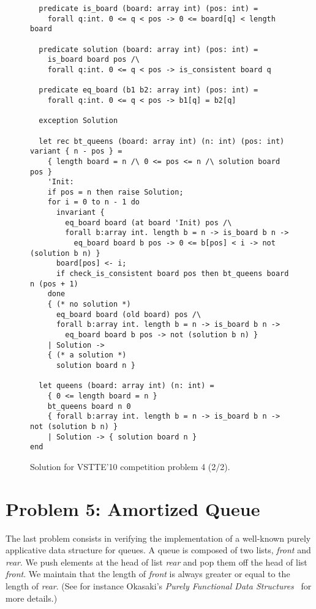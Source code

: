 \begin{figure}
  \centering
\begin{verbatim}
  predicate is_board (board: array int) (pos: int) =
    forall q:int. 0 <= q < pos -> 0 <= board[q] < length board

  predicate solution (board: array int) (pos: int) =
    is_board board pos /\
    forall q:int. 0 <= q < pos -> is_consistent board q

  predicate eq_board (b1 b2: array int) (pos: int) =
    forall q:int. 0 <= q < pos -> b1[q] = b2[q]

  exception Solution

  let rec bt_queens (board: array int) (n: int) (pos: int) variant { n - pos } =
    { length board = n /\ 0 <= pos <= n /\ solution board pos }
    'Init:
    if pos = n then raise Solution;
    for i = 0 to n - 1 do
      invariant {
        eq_board board (at board 'Init) pos /\
        forall b:array int. length b = n -> is_board b n ->
          eq_board board b pos -> 0 <= b[pos] < i -> not (solution b n) }
      board[pos] <- i;
      if check_is_consistent board pos then bt_queens board n (pos + 1)
    done
    { (* no solution *)
      eq_board board (old board) pos /\
      forall b:array int. length b = n -> is_board b n ->
        eq_board board b pos -> not (solution b n) }
    | Solution ->
    { (* a solution *)
      solution board n }

  let queens (board: array int) (n: int) =
    { 0 <= length board = n }
    bt_queens board n 0
    { forall b:array int. length b = n -> is_board b n -> not (solution b n) }
    | Solution -> { solution board n }
end
\end{verbatim}
\vspace*{-2em}\hrulefill
  \caption{Solution for VSTTE'10 competition problem 4 (2/2).}
  \label{fig:NQueens2}
\end{figure}


\section{Problem 5: Amortized Queue}

The last problem consists in verifying the implementation of a
well-known purely applicative data structure for queues.
A queue is composed of two lists, \textit{front} and \textit{rear}.
We push elements at the head of list \textit{rear} and pop them off
the head of list \textit{front}. We maintain that the length of
\textit{front} is always greater or equal to the length of \textit{rear}.
(See for instance Okasaki's \emph{Purely Functional Data
  Structures}~\cite{okasaki98} for more details.)

